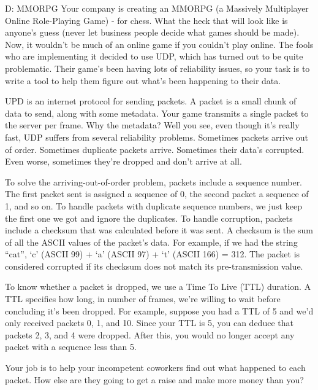 \begin{problem}{D: MMORPG}
Your company is creating an MMORPG (a Massively Multiplayer Online Role-Playing Game) - for chess.
What the heck that will look like is anyone's guess (never let business people decide what games should be made).
Now, it wouldn't be much of an online game if you couldn't play online.
The fools who are implementing it decided to use UDP, which has turned out to be quite problematic.
Their game's been having lots of reliability issues, so your task is to write a tool to help them figure out what's been happening to their data.

UPD is an internet protocol for sending packets.
A packet is a small chunk of data to send, along with some metadata.
Your game transmits a single packet to the server per frame.
Why the metadata?
Well you see, even though it's really fast, UDP suffers from several reliability problems.
Sometimes packets arrive out of order. Sometimes duplicate packets arrive.
Sometimes their data's corrupted.
Even worse, sometimes they're dropped and don't arrive at all.

To solve the arriving-out-of-order problem, packets include a sequence number.
The first packet sent is assigned a sequence of 0, the second packet a sequence of 1, and so on.
To handle packets with duplicate sequence numbers, we just keep the first one we got and ignore the duplicates.
To handle corruption, packets include a checksum that was calculated before it was sent.
A checksum is the sum of all the ASCII values of the packet's data.
For example, if we had the string ``cat'', `c' (ASCII 99) + `a' (ASCII 97) + `t' (ASCII 166) = 312.
The packet is considered corrupted if its checksum does not match its pre-transmission value. 

To know whether a packet is dropped, we use a Time To Live (TTL) duration.
A TTL specifies how long, in number of frames, we're willing to wait before concluding it's been dropped.
For example, suppose you had a TTL of 5 and we'd only received packets 0, 1, and 10.
Since your TTL is 5, you can deduce that packets 2, 3, and 4 were dropped.
After this, you would no longer accept any packet with a sequence less than 5.

Your job is to help your incompetent coworkers find out what happened to each packet. How else are they going to get a raise and make more money than you?
\end{problem}

\newpage

